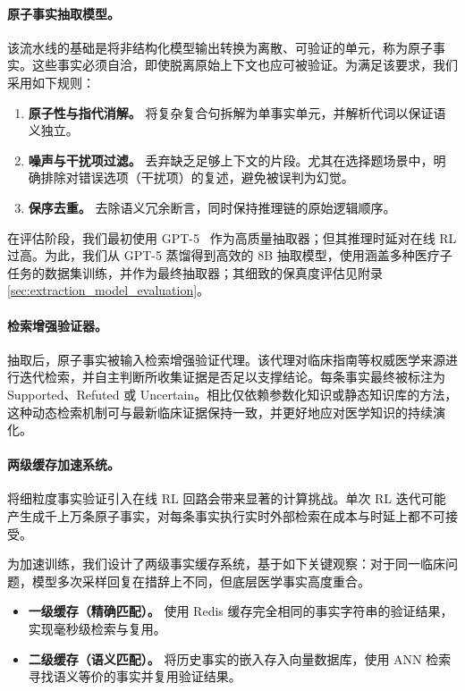 \paragraph{原子事实抽取模型。}

该流水线的基础是将非结构化模型输出转换为离散、可验证的单元，称为原子事实。这些事实必须自洽，即使脱离原始上下文也应可被验证。为满足该要求，我们采用如下规则：

\begin{enumerate}
    \item \textbf{原子性与指代消解。} 将复杂复合句拆解为单事实单元，并解析代词以保证语义独立。
    \item \textbf{噪声与干扰项过滤。} 丢弃缺乏足够上下文的片段。尤其在选择题场景中，明确排除对错误选项（干扰项）的复述，避免被误判为幻觉。
    \item \textbf{保序去重。} 去除语义冗余断言，同时保持推理链的原始逻辑顺序。
\end{enumerate}

在评估阶段，我们最初使用 GPT-5~\cite{singh2025openai} 作为高质量抽取器；但其推理时延对在线 RL 过高。为此，我们从 GPT-5 蒸馏得到高效的 8B 抽取模型，使用涵盖多种医疗子任务的数据集训练，并作为最终抽取器；其细致的保真度评估见附录 \ref{sec:extraction_model_evaluation}。

\paragraph{检索增强验证器。}

抽取后，原子事实被输入检索增强验证代理。该代理对临床指南等权威医学来源进行迭代检索，并自主判断所收集证据是否足以支撑结论。每条事实最终被标注为 Supported、Refuted 或 Uncertain。相比仅依赖参数化知识或静态知识库的方法，这种动态检索机制可与最新临床证据保持一致，并更好地应对医学知识的持续演化。

\paragraph{两级缓存加速系统。}

将细粒度事实验证引入在线 RL 回路会带来显著的计算挑战。单次 RL 迭代可能产生成千上万条原子事实，对每条事实执行实时外部检索在成本与时延上都不可接受。

为加速训练，我们设计了两级事实缓存系统，基于如下关键观察：对于同一临床问题，模型多次采样回复在措辞上不同，但底层医学事实高度重合。

\begin{itemize}
    \item \textbf{一级缓存（精确匹配）。} 使用 Redis 缓存完全相同的事实字符串的验证结果，实现毫秒级检索与复用。
    \item \textbf{二级缓存（语义匹配）。} 将历史事实的嵌入存入向量数据库，使用 ANN 检索寻找语义等价的事实并复用验证结果。
\end{itemize}

